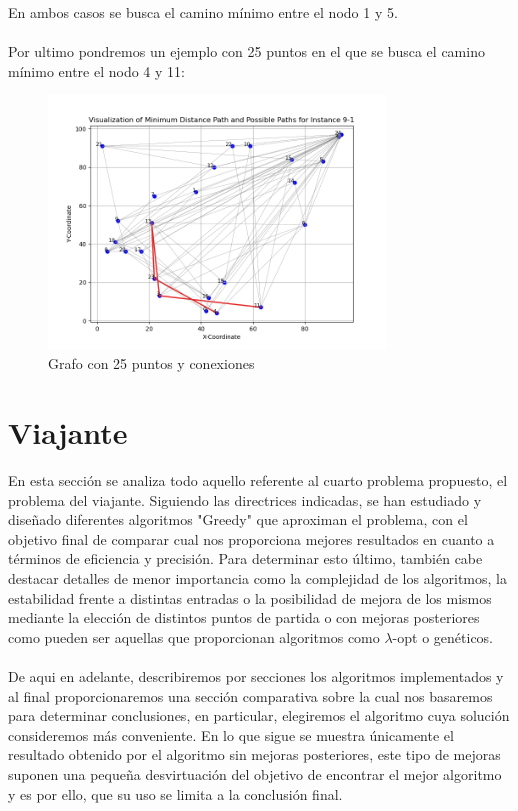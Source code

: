 \documentclass[11pt,openany]{book}
\begin{document}
En ambos casos se busca el camino mínimo entre el nodo 1 y 5.\\ \\
Por ultimo pondremos un ejemplo con 25 puntos en el que se busca el camino mínimo entre el nodo 4 y 11:
\begin{figure}[H]
      \centering
      \includegraphics[width=0.8\textwidth]{assets/Img/GraficaCaminoMinimo-9-1.png}
      \caption{Grafo con 25 puntos y conexiones}
\end{figure}
\chapter{Viajante} %
En esta sección se analiza todo aquello referente al cuarto problema propuesto,
el problema del viajante. Siguiendo las directrices indicadas, se han estudiado
y diseñado diferentes algoritmos "Greedy" que aproximan el problema, con el objetivo
final de comparar cual nos proporciona mejores resultados en cuanto a términos
de eficiencia y precisión. Para determinar esto último, también cabe destacar
detalles de menor importancia como la complejidad de los algoritmos, la estabilidad
frente a distintas entradas o la posibilidad de mejora de los mismos mediante la
elección de distintos puntos de partida o con mejoras posteriores como pueden ser 
aquellas que proporcionan algoritmos como $\lambda$-opt o genéticos.
\\ \\
De aqui en adelante, describiremos por secciones los algoritmos implementados y 
al final proporcionaremos una sección comparativa sobre la cual nos basaremos
para determinar conclusiones, en particular, elegiremos el algoritmo cuya
solución consideremos más conveniente. En lo que sigue se muestra únicamente
el resultado obtenido por el algoritmo sin mejoras posteriores, este tipo de mejoras
suponen una pequeña desvirtuación del objetivo de encontrar el mejor algoritmo y 
es por ello, que su uso se limita a la conclusión final.
\end{document}
